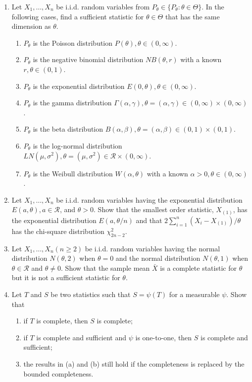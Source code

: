 \begin{enumerate}
    \item Let \(X_{1},\ldots,X_{n}\) be i.i.d. random variables from \(P_{\theta}\in\{P_{\theta}:\theta\in\Theta\}\). In the following cases, find a sufficient statistic for \(\theta\in\Theta\) that has the same dimension as \(\theta\).
    \begin{enumerate}
        \item \(P_{\theta}\) is the Poisson distribution \(P(\theta),\theta\in(0,\infty)\).
        \item \(P_{\theta}\) is the negative binomial distribution \(NB(\theta,r)\) with a known \(r,\theta\in(0,1)\).
        \item \(P_{\theta}\) is the exponential distribution \(E(0,\theta),\theta\in(0,\infty)\).
        \item \(P_{\theta}\) is the gamma distribution \(\Gamma(\alpha,\gamma),\theta=(\alpha,\gamma)\in(0,\infty)\times(0,\infty)\).
        \item \(P_{\theta}\) is the beta distribution \(B(\alpha,\beta),\theta=(\alpha,\beta)\in(0,1)\times(0,1)\).
        \item \(P_{\theta}\) is the log-normal distribution \(LN\left(\mu,\sigma^{2}\right),\theta=\left(\mu,\sigma^{2}\right)\in\mathcal{R}\times(0,\infty)\).
        \item \(P_{\theta}\) is the Weibull distribution \(W(\alpha,\theta)\) with a known \(\alpha>0,\theta\in(0,\infty)\).
    \end{enumerate}

    \item Let \(X_{1},\ldots,X_{n}\) be i.i.d. random variables having the exponential distribution \(E(a,\theta),a\in\mathcal{R}\), and \(\theta>0\). Show that the smallest order statistic, \(X_{(1)}\), has the exponential distribution \(E(a,\theta/n)\) and that \(2\sum_{i=1}^{n}\left(X_{i}-X_{(1)}\right)/\theta\) has the chi-square distribution \(\chi_{2n-2}^{2}\).

    \item Let \(X_{1},\ldots,X_{n}(n\geq 2)\) be i.i.d. random variables having the normal distribution \(N(\theta,2)\) when \(\theta=0\) and the normal distribution \(N(\theta,1)\) when \(\theta\in\mathcal{R}\) and \(\theta\neq 0\). Show that the sample mean \(\bar{X}\) is a complete statistic for \(\theta\) but it is not a sufficient statistic for \(\theta\).

    \item Let \(T\) and \(S\) be two statistics such that \(S=\psi(T)\) for a measurable \(\psi\). Show that
    \begin{enumerate}
        \item if \(T\) is complete, then \(S\) is complete;
        \item if \(T\) is complete and sufficient and \(\psi\) is one-to-one, then \(S\) is complete and sufficient;
        \item the results in (a) and (b) still hold if the completeness is replaced by the bounded completeness.
    \end{enumerate}


\end{enumerate}
